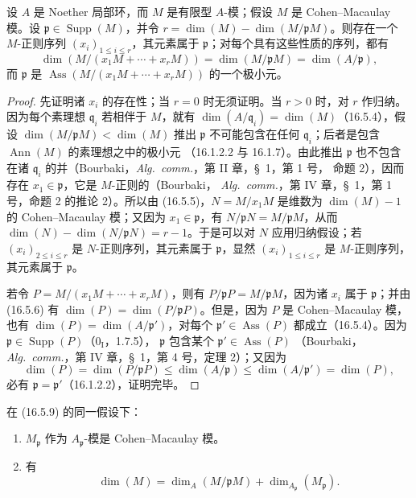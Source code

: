 \begin{proposition}[16.5.9]
\label{0.16.5.9-fr}
设 $A$ 是 Noether 局部环，而 $M$ 是有限型 $A$-模；假设 $M$ 是
Cohen--Macaulay 模。设 $\mathfrak{p}\in\operatorname{Supp}(M)$，并令
$r=\dim(M)-\dim(M/\mathfrak{p}M)$。则存在一个 $M$-正则序列
$(x_i)_{1\leq i\leq r}$，其元素属于 $\mathfrak{p}$；对每个具有这些性质的序列，都有
\[
  \dim(M/(x_1M+\cdots+x_rM))
  =\dim(M/\mathfrak{p}M)=\dim(A/\mathfrak{p}),
\]
而 $\mathfrak{p}$ 是 $\operatorname{Ass}(M/(x_1M+\cdots+x_rM))$ 的一个极小元。
\end{proposition}

\begin{proof}
先证明诸 $x_i$ 的存在性；当 $r=0$ 时无须证明。当 $r>0$ 时，对 $r$ 作归纳。
因为每个素理想 $\mathfrak{q}_i$ 若相伴于 $M$，就有
$\dim(A/\mathfrak{q}_i)=\dim(M)$（16.5.4），假设
$\dim(M/\mathfrak{p}M)<\dim(M)$ 推出 $\mathfrak{p}$ 不可能包含在任何
$\mathfrak{q}_i$；后者是包含 $\operatorname{Ann}(M)$ 的素理想之中的极小元
（16.1.2.2 与 16.1.7）。由此推出 $\mathfrak{p}$ 也不包含在诸
$\mathfrak{q}_i$ 的并（Bourbaki，\emph{Alg.~comm.}，第 II 章，\S~1，第 1 号，
命题 2），因而存在 $x_1\in\mathfrak{p}$，它是 $M$-正则的（Bourbaki，
\emph{Alg.~comm.}，第 IV 章，\S~1，第 1 号，命题 2 的推论 2）。所以由
(16.5.5)，$N=M/x_1M$ 是维数为 $\dim(M)-1$ 的 Cohen--Macaulay 模；又因为
$x_1\in\mathfrak{p}$，有 $N/\mathfrak{p}N=M/\mathfrak{p}M$，从而
$\dim(N)-\dim(N/\mathfrak{p}N)=r-1$。于是可以对 $N$ 应用归纳假设；若
$(x_i)_{2\leq i\leq r}$ 是 $N$-正则序列，其元素属于 $\mathfrak{p}$，显然
$(x_i)_{1\leq i\leq r}$ 是 $M$-正则序列，其元素属于 $\mathfrak{p}$。

若令 $P=M/(x_1M+\cdots+x_rM)$，则有
$P/\mathfrak{p}P=M/\mathfrak{p}M$，因为诸 $x_i$ 属于 $\mathfrak{p}$；并由 (16.5.6) 有
$\dim(P)=\dim(P/\mathfrak{p}P)$。但是，因为 $P$ 是 Cohen--Macaulay 模，也有
$\dim(P)=\dim(A/\mathfrak{p}')$，对每个
$\mathfrak{p}'\in\operatorname{Ass}(P)$ 都成立（16.5.4）。因为
$\mathfrak{p}\in\operatorname{Supp}(P)$（$0_{\mathrm I}$，1.7.5），
$\mathfrak{p}$ 包含某个 $\mathfrak{p}'\in\operatorname{Ass}(P)$
（Bourbaki，\emph{Alg.~comm.}，第 IV 章，\S~1，第 4 号，定理 2）；又因为
\[
  \dim(P)=\dim(P/\mathfrak{p}P)
  \leq\dim(A/\mathfrak{p})
  \leq\dim(A/\mathfrak{p}')=\dim(P),
\]
必有 $\mathfrak{p}=\mathfrak{p}'$（16.1.2.2），证明完毕。
\end{proof}

\begin{corollary}[16.5.10]
\label{0.16.5.10-fr}
在 (16.5.9) 的同一假设下：
\begin{enumerate}
  \item[(i)] $M_{\mathfrak{p}}$ 作为 $A_{\mathfrak{p}}$-模是 Cohen--Macaulay 模。
  \item[(ii)] 有
  \begin{equation}
  \label{0.16.5.10.1-fr}
  \tag{16.5.10.1}
    \dim(M)=\dim_A(M/\mathfrak{p}M)
    +\dim_{A_{\mathfrak{p}}}(M_{\mathfrak{p}}).
  \end{equation}
\end{enumerate}
\end{corollary}

